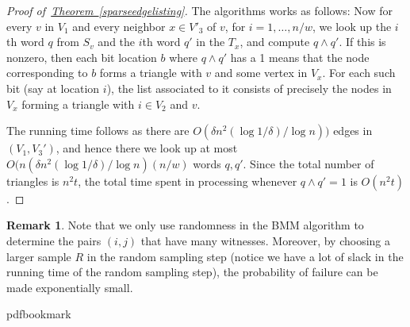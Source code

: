 \documentclass[10pt]{article}
\theoremstyle{definition}
\newtheorem{remark}[theorem]{Remark}
\numberwithin{equation}{section}
\newcommand{\expref}[2]{\texorpdfstring{\hyperref[#2]{#1~\ref{#2}}}{#1~\ref{#2}}}
\begin{document}
\begin{proof}[Proof of~\expref{Theorem}{sparseedgelisting}]
The algorithms works as follows: Now for every $v$ in $V_1$ and every neighbor $x \in V'_3$ of $v$, for $i=1,\ldots,n/w$, we look up
the $i$th word $q$ from $S_v$ and the $i$th word $q'$ in the $T_x$, and compute $q \wedge q'$. If this is nonzero, then each bit location $b$ where $q\wedge q'$ has a 1 means that the node corresponding to $b$ forms a triangle with $v$ and some vertex in $V_x$. For each such bit (say at location $i$), the list associated to it consists of precisely the nodes in $V_x$ forming a triangle with $i \in V_2$ and $v$.

The running time follows as there are $O(\delta n^2 (\log 1/\delta)/ \log n))$ edges in $(V_1,V_3')$, and hence there we look up at most $O(n (\delta n^2 (\log 1/\delta)/ \log n)  (n/w)$ words $q,q'$. Since the total number of triangles is $n^2 t$, the total time spent in processing whenever
 $q \wedge q'=1$ is $O(n^2 t)$.
\end{proof}


\begin{remark} Note that we only use randomness in the BMM algorithm  to determine the pairs $(i,j)$ that have many  witnesses.  Moreover, by choosing a larger sample $R$ in the random sampling step (notice we have a lot of slack in the running time of the random sampling step), the probability of failure can be made exponentially small.\end{remark}
\clearpage
\begingroup\raggedright
%
%
%
%
%
\providecommand{\bibhead}[1]{}
%
\expandafter\ifx\csname pdfbookmark\endcsname\relax%
  \providecommand{\tocrefpdfbookmark}{}
\else\providecommand{\tocrefpdfbookmark}{%
   \hypertarget{tocreferences}{}%
   \pdfbookmark[1]{References}{tocreferences}}%
\fi
\end{document}
